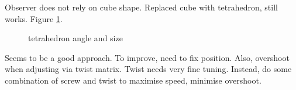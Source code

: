 Observer does not rely on cube shape. Replaced cube with tetrahedron, still works. Figure \ref{fig:tetrahedron}.
\begin{figure}
\centering
 	\caption{tetrahedron angle and size}
 	\label{fig:tetrahedron}
\end{figure}

Seems to be a good approach. To improve, need to fix position. Also, overshoot when adjusting via twist matrix. Twist needs very fine tuning. Instead, do some combination of screw and twist to maximise speed, minimise overshoot.
